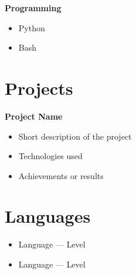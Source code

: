 \documentclass[10pt,a4paper]{article}
\begin{document}
	\textbf{Programming}
	
	\begin{itemize}
		
		\item Python
		\item Bash
		
	\end{itemize}
	
	
	\section*{Projects}
	
	\textbf{Project Name}
	
	\begin{itemize}
		
		\item Short description of the project
		\item Technologies used
		\item Achievements or results
		
	\end{itemize}
	
	
	\section*{Languages}
	
	\begin{itemize}
		
		\item Language — Level
		\item Language — Level
		
	\end{itemize}
	
\end{document}
